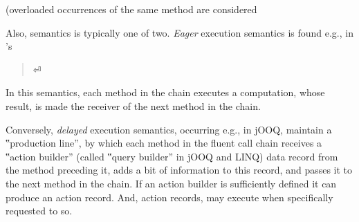 (overloaded occurrences of the same method are considered   
  
  
  
  Also, semantics is typically one of two.
\emph{Eager} execution semantics is
found e.g., in \Java's 

\begin{quote}
  \parbox[c]{50ex}{}⏎
\end{quote}

In this semantics, each method in the chain executes a computation,
  whose result, is made the receiver of the next method
  in the chain.

Conversely, \emph{delayed} execution semantics, occurring e.g., in jOOQ,
  maintain a ‟production line”,
  by which each method in the fluent call chain receives a
  ‟action builder” (called ‟query builder” in jOOQ and LINQ)
  data record from the method preceding it, adds a bit of
  information to this record, and passes it to the next method
  in the chain.
If an action builder is sufficiently defined it can
  produce an action record.
And, action records, may execute
  when specifically requested to so.


